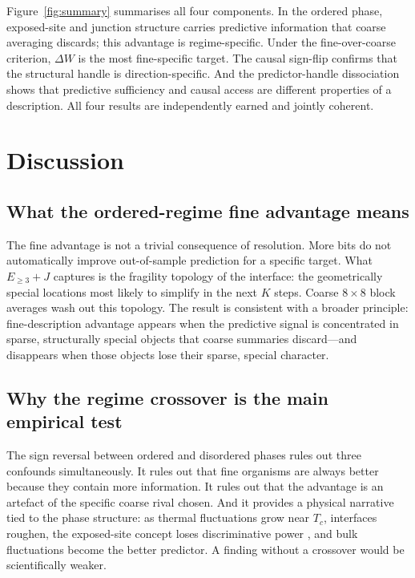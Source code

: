 \documentclass[11pt,a4paper]{article}
\begin{document}
Figure~\ref{fig:summary} summarises all four components.
In the ordered phase, exposed-site and junction structure carries
predictive information that coarse averaging discards; this advantage
is regime-specific.
Under the fine-over-coarse criterion, $\Delta W$ is the most fine-specific
target.
The causal sign-flip confirms that the structural handle is
direction-specific.
And the predictor-handle dissociation shows that predictive sufficiency
and causal access are different properties of a description.
All four results are independently earned and jointly coherent.

\section{Discussion}
\label{sec:discussion}

\subsection{What the ordered-regime fine advantage means}

The fine advantage is not a trivial consequence of resolution.
More bits do not automatically improve out-of-sample prediction for a
specific target.
What $E_{\geq 3}+J$ captures is the fragility topology of the interface:
the geometrically special locations most likely to simplify in the next
$K$ steps.
Coarse $8\times 8$ block averages wash out this topology.
The result is consistent with a broader principle: fine-description
advantage appears when the predictive signal is concentrated in sparse,
structurally special objects that coarse summaries discard---and disappears
when those objects lose their sparse, special character.

\subsection{Why the regime crossover is the main empirical test}

The sign reversal between ordered and disordered phases rules out three
confounds simultaneously.
It rules out that fine organisms are always better because they contain
more information.
It rules out that the advantage is an artefact of the specific coarse
rival chosen.
And it provides a physical narrative tied to the phase structure: as
thermal fluctuations grow near $T_c$, interfaces roughen, the exposed-site
concept loses discriminative power \citep{bray1994}, and bulk fluctuations
become the better predictor.
A finding without a crossover would be scientifically weaker.
\end{document}
